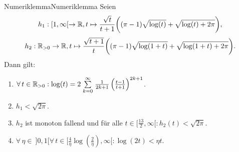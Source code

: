 \begin{lemma}{Numeriklemma}{Numeriklemma}
Seien 
\[h_1: [1, \infty[ \rightarrow \mathbb{R}, 
t\mapsto\frac{\sqrt t}{t+1}
\bigg((\pi-1)\sqrt{\log(t)}+\sqrt{\log(t)+2\pi}\bigg)\text,\]
\[h_2: \mathbb{R}_{>0} \rightarrow \mathbb{R},
t \mapsto \frac{\sqrt{t+1}}t
\bigg( (\pi-1)\sqrt{\log(1+t)} + \sqrt{\log(1+t) + 2\pi} \bigg)\text.\]
Dann gilt:
\begin{enumerate}[(1)]
	\item \label{Numeriklemma0}
	$\forall\, t \in \mathbb{R}_{>0}: \log(t) = 2\stackrel{\infty}{\underset{k=0}{\sum}} \frac 1 {2k+1}
	\left(\frac{t-1}{t+1} \right)^{2k+1}$.
	\item \label{Numeriklemma1}
	$h_1 < \sqrt{2 \pi}$.
	\item \label{Numeriklemma2}
	$h_2$ ist monoton fallend und für alle $t \in [\frac{13}2, \infty[:
	h_2(t) < \sqrt{2 \pi}$.
	\item\label{Numeriklemma4}
	$\forall\, \eta\in\!\  ]0,1[ 
	 \forall \,t\in 
	 \bigg[\frac 4\eta \log\left(\frac 2 \eta\right), \infty\bigg[
	 : \log(2t)< \eta t$.
\end{enumerate}
\end{lemma}

